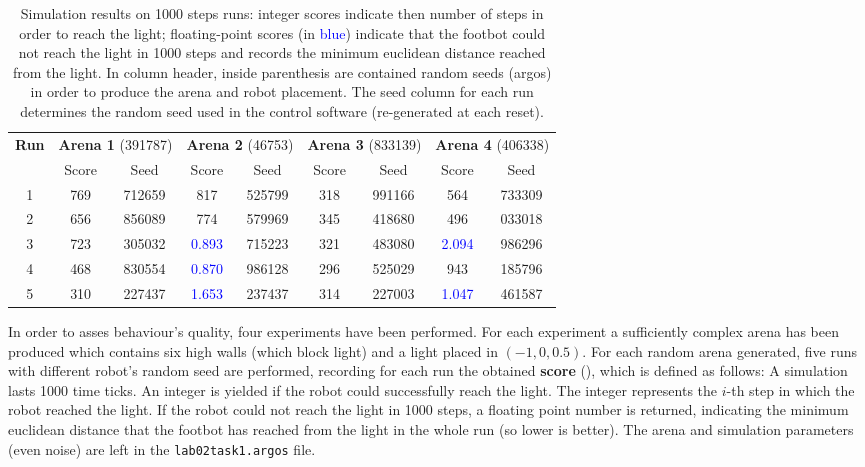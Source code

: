 \begin{table}[ht]
\centering
\begin{tabular}{c|cc|cc|cc|cc}
\textbf{Run} & \multicolumn{2}{c|}{\textbf{Arena 1} (391787)} & \multicolumn{2}{c|}{\textbf{Arena 2} (46753)} & \multicolumn{2}{c|}{\textbf{Arena 3} (833139)} & \multicolumn{2}{c}{\textbf{Arena 4} (406338)} \\
 & Score & Seed & Score & Seed & Score & Seed & Score & Seed \\
\hline
1 & 769 & 712659 & 817 & 525799 & 318 & 991166 & 564 & 733309 \\
2 & 656 & 856089 & 774 & 579969 & 345 & 418680 & 496 & 033018 \\
3 & 723 & 305032 & \textcolor{blue}{0.893} & 715223 & 321 & 483080 & \textcolor{blue}{2.094} & 986296 \\
4 & 468 & 830554 & \textcolor{blue}{0.870} & 986128 & 296 & 525029 & 943 & 185796 \\
5 & 310 & 227437 & \textcolor{blue}{1.653} & 237437 & 314 & 227003 & \textcolor{blue}{1.047} & 461587 \\
\end{tabular}
\caption{Simulation results on 1000 steps runs: integer scores indicate then
    number of steps in order to reach the light; floating-point scores (in
    \textcolor{blue}{blue}) indicate that the footbot could not reach the light
    in 1000 steps and records the minimum euclidean distance reached from the
    light. In column header, inside parenthesis are contained random seeds
    (argos) in order to produce the arena and robot placement. The seed column for
    each run determines the random seed used in the control software (re-generated
    at each reset).}
\label{tab:simulation-results}
\end{table}

In order to asses behaviour's quality, four experiments have been performed.
For each experiment a sufficiently complex arena has been produced which
contains six high walls (which block light) and a light placed in $(-1,0,0.5)$.
For each random arena generated, five runs with different robot's random seed
are performed, recording for each run the obtained \textbf{score}
(), which is defined as follows: A simulation
lasts 1000 time ticks. An integer is yielded if the robot could successfully
reach the light. The integer represents the $i$-th step in which the robot
reached the light. If the robot could not reach the light in 1000 steps, a
floating point number is returned, indicating the minimum euclidean distance
that the footbot has reached from the light in the whole run (so lower is
better). The arena and simulation parameters (even noise) are left in the
\texttt{lab02task1.argos} file.


